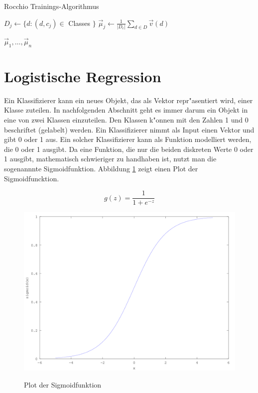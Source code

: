 \documentclass[12pt,a4paper,twoside]{article}
\begin{document}
\begin{algorithm}
\caption{Rocchio Trainings-Algorithmus}
\begin{algorithmic}

\State $ D_j \gets  \{d : (d,c_j) \in$ Classes $\}$
\State  $\vec \mu_j \gets \frac{1}{|D_c|} \sum_{d \in D} \vec v (d)$
\EndFor

\Return ${\vec \mu_1, \dots , \vec \mu_n }$    
 \end{algorithmic}  
\end{algorithm}

\section{Logistische Regression}
\label{sec:logisticreg}

Ein Klassifizierer kann ein neues Objekt, das als Vektor repr"asentiert wird, einer Klasse zuteilen. In nachfolgenden Abschnitt geht es immer darum ein Objekt in eine von zwei Klassen einzuteilen. Den Klassen k"onnen mit den Zahlen 1 und 0 beschriftet (gelabelt) werden. Ein Klassifizierer nimmt als Input einen Vektor und gibt 0 oder 1 aus. Ein solcher Klassifizierer kann als Funktion modelliert werden, die 0 oder 1 ausgibt. Da eine Funktion, die nur die beiden diskreten Werte 0 oder 1 ausgibt, mathematisch schwieriger zu handhaben ist, nutzt man die sogenannnte Sigmoidfunktion. Abbildung \ref{fig:sigmoidfunc} zeigt einen Plot der Sigmoidfuncktion. 

\[
g(z) = \frac{1}{1 + e^{-z}}
\]


\begin{figure}
  \includegraphics[scale=0.3]{sigmoid}
  \centering
  \label{fig:sigmoidfunc}
  \caption{Plot der Sigmoidfunktion}
\end{figure}
\end{document}
